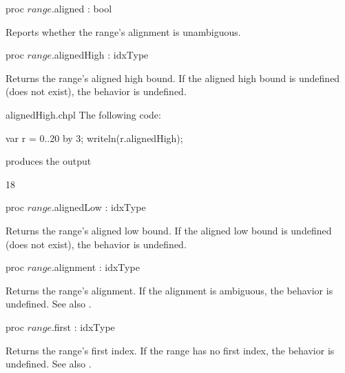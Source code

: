 \begin{protohead}
proc $range$.aligned : bool
\end{protohead}
\begin{protobody}
Reports whether the range's alignment is unambiguous.
\end{protobody}

\begin{protohead}
proc $range$.alignedHigh : idxType
\end{protohead}
\begin{protobody}
Returns the range's aligned high bound.
If the aligned high bound is undefined (does not exist),
the behavior is undefined.
\end{protobody}
\begin{chapelexample}{alignedHigh.chpl}
The following code:
\begin{chapel}
var r = 0..20 by 3;
writeln(r.alignedHigh);
\end{chapel}
produces the output
\begin{chapelprintoutput}
18
\end{chapelprintoutput}
\end{chapelexample}

\begin{protohead}
proc $range$.alignedLow : idxType
\end{protohead}
\begin{protobody}
Returns the range's aligned low bound.
If the aligned low bound is undefined (does not exist),
the behavior is undefined.
\end{protobody}

\begin{protohead}
proc $range$.alignment : idxType
\end{protohead}
\begin{protobody}
Returns the range's alignment.
If the alignment is ambiguous, the behavior is undefined.
See also .
\end{protobody}

\begin{protohead}
proc $range$.first : idxType
\end{protohead}
\begin{protobody}
Returns the range's first index.
If the range has no first index, the behavior is undefined.
See also .
\end{protobody}

